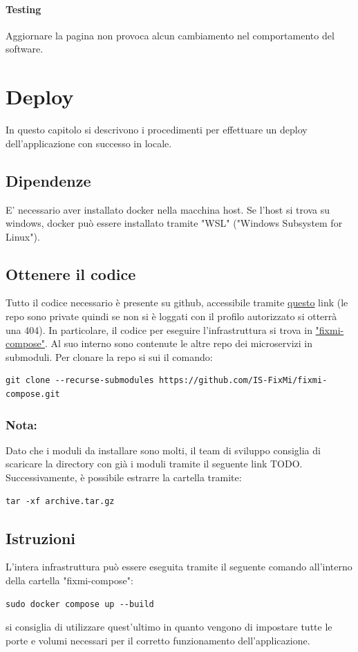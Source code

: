 \documentclass{report}
\begin{document}
\subsubsection*{Testing}
Aggiornare la pagina non provoca alcun cambiamento nel comportamento del software.

\chapter{Deploy}

In questo capitolo si descrivono i procedimenti per effettuare un deploy dell'applicazione con successo in locale.

\section{Dipendenze}
E' necessario aver installato docker nella macchina host. Se l'host si trova su windows, docker può essere installato tramite "WSL" ("Windows Subsystem for Linux").


\section{Ottenere il codice}
Tutto il codice necessario è presente su github, accessibile tramite \href{https://github.com/orgs/IS-FixMi/repositories}{questo} link (le repo sono private quindi se non si è loggati con il profilo autorizzato si otterrà una 404). In particolare, il codice per eseguire l'infrastruttura si trova in \href{https://github.com/IS-FixMi/fixmi-compose}{"fixmi-compose"}. Al suo interno sono contenute le altre repo dei microservizi in submoduli. Per clonare la repo si sui il comando:
\begin{verbatim}
git clone --recurse-submodules https://github.com/IS-FixMi/fixmi-compose.git
\end{verbatim}
\subsection*{Nota:}
Dato che i moduli da installare sono molti, il team di sviluppo consiglia di scaricare la directory con già i moduli tramite il seguente link TODO.
Successivamente, è possibile estrarre la cartella tramite:
\begin{verbatim}
tar -xf archive.tar.gz
\end{verbatim}

\section{Istruzioni}
L'intera infrastruttura può essere eseguita tramite il seguente comando all'interno della cartella "fixmi-compose":
\begin{verbatim}
sudo docker compose up --build
\end{verbatim}
si consiglia di utilizzare quest'ultimo in quanto vengono di impostare tutte le porte e volumi necessari per il corretto funzionamento dell'applicazione.
\end{document}
